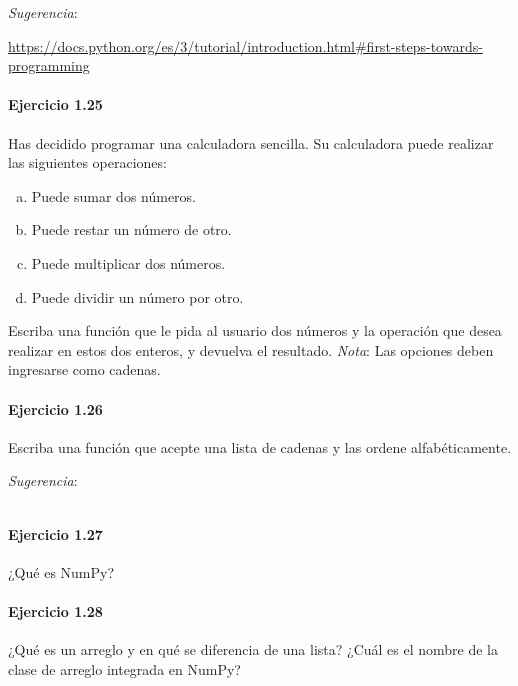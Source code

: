 \emph{Sugerencia}:

\url{https://docs.python.org/es/3/tutorial/introduction.html#first-steps-towards-programming}

\paragraph{\color{DarkBlue}Ejercicio 1.25}
Has decidido programar una calculadora sencilla.
Su calculadora puede realizar las siguientes operaciones:
\begin{multicols}{2}
	\begin{enumerate}[(a)]
		\item

		      Puede sumar dos números.
		\item

		      Puede restar un número de otro.

		\item

		      Puede multiplicar dos números.

		\item

		      Puede dividir un número por otro.
	\end{enumerate}
\end{multicols}

Escriba una función que le pida al usuario dos números y la operación
que desea realizar en estos dos enteros, y devuelva el resultado.
\emph{Nota}: Las opciones deben ingresarse como cadenas.

\paragraph{\color{DarkBlue}Ejercicio 1.26}
Escriba una función que acepte una lista de cadenas y las ordene
alfabéticamente.

\emph{Sugerencia}:
\begin{listing}[ht!]
	\inputminted{python}{1.26.py}
\end{listing}

\paragraph{\color{DarkBlue}Ejercicio 1.27}
¿Qué es NumPy?

\paragraph{\color{DarkBlue}Ejercicio 1.28}
¿Qué es un arreglo y en qué se diferencia de una lista?
¿Cuál es el nombre de la clase de arreglo integrada en NumPy?

